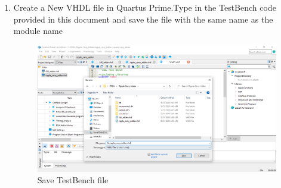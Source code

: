 \documentclass[12pt,singleside,a4paper]{article}
\begin{document}
 \begin{enumerate}
     \item Create a New VHDL file in Quartus Prime.Type in the TestBench code provided in this document and save the file with the same name as the module name
    \begin{figure}[H]
        \centering
    \includegraphics[width=14cm,keepaspectratio]{img22.png}
    \caption{Save TestBench file}
    \end{figure}
   

\end{enumerate}
\end{document}
